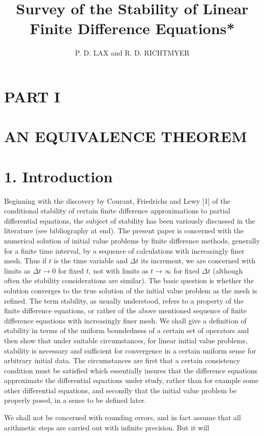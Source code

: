 \documentclass[10pt]{article}
\title{Survey of the Stability of Linear Finite Difference Equations* }
\author{P. D. LAX and R. D. RICHTMYER}
\date{}
\begin{document}
\maketitle


\section*{PART I}
\section*{AN EQUIVALENCE THEOREM}
\section*{1. Introduction}
Beginning with the discovery by Courant, Friedrichs and Lewy [1] of the conditional stability of certain finite difference approximations to partial differential equations, the subject of stability has been variously discussed in the literature (see bibliography at end). The present paper is concerned with the numerical solution of initial value problems by finite difference methods, generally for a finite time interval, by a sequence of calculations with increasingly finer mesh. Thus if \(t\) is the time variable and \(\Delta t\) its increment, we are concerned with limits as \(\Delta t \rightarrow 0\) for fixed \(t\), not with limits as \(t \rightarrow \infty\) for fixed \(\Delta t\) (although often the stability considerations are similar). The basic question is whether the solution converges to the true solution of the initial value problem as the mesh is refined. The term stability, as usually understood, refers to a property of the finite difference equations, or rather of the above mentioned sequence of finite difference equations with increasingly finer mesh. We shall give a definition of stability in terms of the uniform boundedness of a certain set of operators and then show that under suitable circumstances, for linear initial value problems, stability is necessary and sufficient for convergence in a certain uniform sense for arbitrary initial data. The circumstances are first that a certain consistency condition must be satisfied which essentially insures that the difference equations approximate the differential equations under study, rather than for example some other differential equations, and secondly that the initial value problem be properly posed, in a sense to be defined later.

We shall not be concerned with rounding errors, and in fact assume that all arithmetic steps are carried out with infinite precision. But it will
\end{document}

